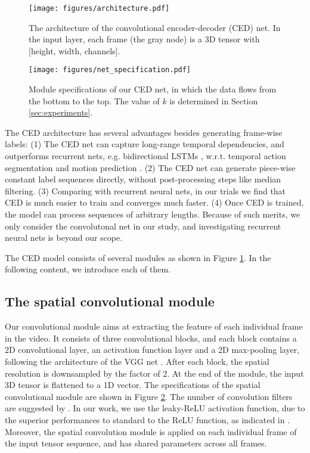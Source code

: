 \documentclass[runningheads]{llncs}
\begin{document}
\begin{figure}
\centering
\texttt{[image: figures/architecture.pdf]}
\caption{The architecture of the convolutional encoder-decoder (CED) net. In the input layer, each frame (the gray node) is a 3D tensor with [height, width, channels].}
\label{fig:architecture}
\end{figure}


\begin{figure}
\centering
\texttt{[image: figures/net\_specification.pdf]}
\caption{Module specifications of our CED net, in which the data flows from the bottom to the top. The value of $k$ is determined in Section \ref{sec:experiments}. }
\label{fig:net_specification}
\end{figure}

The CED architecture has several advantages besides generating frame-wise labels: (1) The CED net can capture long-range temporal dependencies, and outperforms recurrent nets, e.g. bidirectional LSTMs \cite{graves2005bidirectional} \cite{singh2016multi}, w.r.t. temporal action segmentation \cite{Lea_2017_CVPR} and motion prediction \cite{li2018convolutional}. (2) The CED net can generate piece-wise constant label sequences directly, without post-processing steps like median filtering. (3) Comparing with recurrent neural nets, in our trials we find that CED is much easier to train and converges much faster. (4) Once CED is trained, the model can process sequences of arbitrary lengths. Because of such merits, we only consider the convolutonal net in our study, and investigating recurrent neural nets is beyond our scope.


The CED model consists of several modules as shown in Figure \ref{fig:architecture}. In the following content, we introduce each of them.  


\subsection{The spatial convolutional module}
Our convolutional module aims at extracting the feature of each individual frame in the video. It consists of three convolutional blocks, and each block contains a 2D convolutional layer, an activation function layer and a 2D max-pooling layer, following the architecture of the VGG net \cite{simonyan2014very} \cite{Lea_2017_CVPR}. After each block, the spatial resolution is downsampled by the factor of 2. At the end of the module, the input 3D tensor is flattened to a 1D vector. The specifications of the spatial convolutional module are shown in Figure \ref{fig:net_specification}. The number of convolution filters are suggested by \cite{lea2016segmental}. In our work, we use the leaky-ReLU \cite{maas2013rectifier} activation function, due to the superior performances to standard to the ReLU function, as indicated in \cite{xu2015empirical}. Moreover, the spatial convolution module is applied on each individual frame of the input tensor sequence, and has shared parameters across all frames. 
\end{document}
